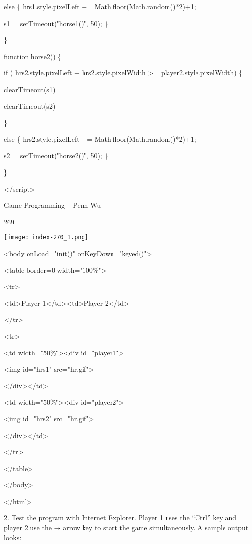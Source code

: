 \documentclass[
]{article}
\begin{document}
else \{ hrs1.style.pixelLeft += Math.floor(Math.random()*2)+1;

s1 = setTimeout("horse1()", 50); \}

\}

function horse2() \{

if ( hrs2.style.pixelLeft + hrs2.style.pixelWidth \textgreater=
player2.style.pixelWidth) \{

clearTimeout(s1);

clearTimeout(s2);

\}

else \{ hrs2.style.pixelLeft += Math.floor(Math.random()*2)+1;

s2 = setTimeout("horse2()", 50); \}

\}

\textless/script\textgreater{}

Game Programming -- Penn Wu

269

\protect\hypertarget{index_split_014.htmlux5cux23p270}{}{}\texttt{[image: index-270\_1.png]}

\textless body onLoad="init()" onKeyDown="keyed()"\textgreater{}

\textless table border=0 width="100\%"\textgreater{}

\textless tr\textgreater{}

\textless td\textgreater Player
1\textless/td\textgreater\textless td\textgreater Player
2\textless/td\textgreater{}

\textless/tr\textgreater{}

\textless tr\textgreater{}

\textless td width="50\%"\textgreater\textless div
id="player1"\textgreater{}

\textless img id="hrs1" src="hr.gif"\textgreater{}

\textless/div\textgreater\textless/td\textgreater{}

\textless td width="50\%"\textgreater\textless div
id="player2"\textgreater{}

\textless img id="hrs2" src="hr.gif"\textgreater{}

\textless/div\textgreater\textless/td\textgreater{}

\textless/tr\textgreater{}

\textless/table\textgreater{}

\textless/body\textgreater{}

\textless/html\textgreater{}

2. Test the program with Internet Explorer. Player 1 uses the ``Ctrl''
key and player 2 use the → arrow key to start the game simultaneously. A
sample output looks:
\end{document}
